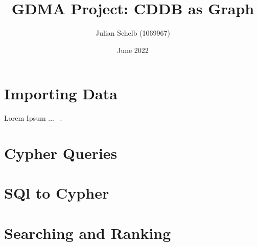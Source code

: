 \documentclass{article}
\title{GDMA Project: CDDB as Graph}
\author{Julian Schelb (1069967)}
\date{June 2022}
\begin{document}
\maketitle

\section{Importing Data}

Lorem Ipsum ... ~\cite{Nobody06}.

\section{Cypher Queries}

\section{SQl to Cypher}

\section{Searching and Ranking}

{}

\end{document}
